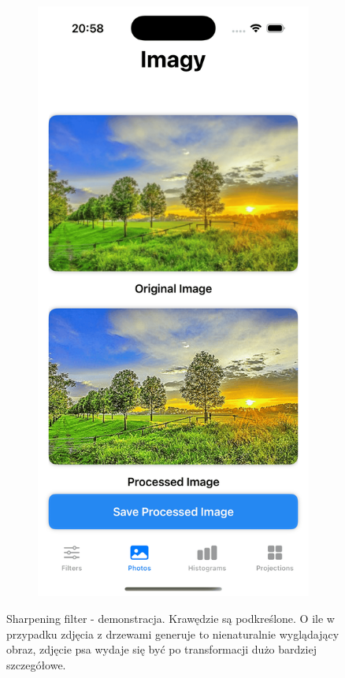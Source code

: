 \documentclass[a4paper]{article}
\begin{document}
\begin{figure}[H]
\begin{subfigure}{0.2\textwidth}
        \label{fig:dog_sharpening}
    \end{subfigure}
    \begin{subfigure}{0.2\textwidth}
        \centering
        \includegraphics[width=\linewidth]{images/trees_sharpening.png}
        \label{fig:trees_sharpening}
    \end{subfigure}
    \caption{Sharpening filter - demonstracja. Krawędzie są podkreślone. O ile w przypadku zdjęcia z drzewami generuje to nienaturalnie wyglądający obraz, zdjęcie psa wydaje się być po transformacji dużo bardziej szczegółowe.}
    \label{fig:sharpening}
\end{figure}
\end{document}
